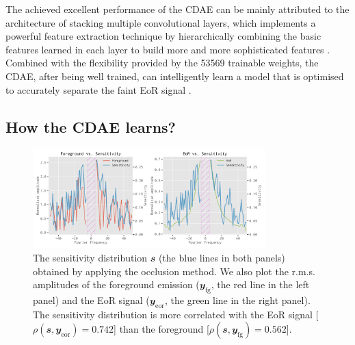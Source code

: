 \documentclass[fleqn,usenatbib]{mnras}
\newcommand{\R}[1]{\mathrm{#1}}
\newcommand{\B}[1]{\mathbfit{#1}}
\newcommand{\editwip}[1]{{\leavevmode\color{magenta}#1}}
\begin{document}
The achieved excellent performance of the CDAE can be mainly attributed
to the architecture of stacking multiple convolutional layers, which
implements a powerful feature extraction technique by hierarchically
combining the basic features learned in each layer to build more and
more sophisticated features \citep{lecun2015}.
Combined with the flexibility provided by the \num{53569} trainable
weights, the CDAE, after being well trained, can intelligently learn a
model that is optimised to accurately separate the faint EoR signal
\citep[e.g.,][]{domingos2012}.


\editwip{%
\subsection{How the CDAE learns?}
\label{sec:explanation}

\begin{figure}
  \centering
  \includegraphics[width=0.8\textwidth]{occlusion-fgeor}
  \caption{\label{fig:occ-fgeor}\editwip{%
    The sensitivity distribution $\B{s}$ (the blue lines in both panels)
    obtained by applying the occlusion method.
    We also plot the r.m.s\@. amplitudes of the foreground emission
    ($\B{y}_{\R{fg}}$, the red line in the left panel) and the EoR signal
    ($\B{y}_{\R{eor}}$, the green line in the right panel).
    The sensitivity distribution is more correlated with the EoR signal
    [$\rho(\B{s}, \B{y}_{\R{eor}}) = 0.742$] than the foreground
    [$\rho(\B{s}, \B{y}_{\R{fg}}) = 0.562$].
  }}
\end{figure}

}
\end{document}
